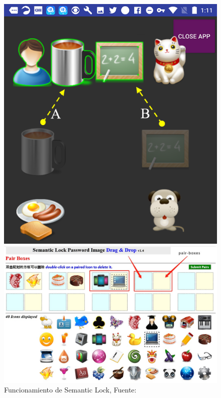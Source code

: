 \begin{anexos}
\begin{figure}[H]
\end{figure}


\begin{figure}[H]
	\centering
	\begin{minipage}{0.5\linewidth}  %
		\centering
		\includegraphics[width=0.8\linewidth]{semantoc-psw-2.png} %
		
	\end{minipage}%
	\hfill
	\begin{minipage}{0.5\linewidth} %
		\centering
		\includegraphics[width=0.8\linewidth]{semantic-psww1.jpg} %
		
	\end{minipage}
	\caption{Funcionamiento de Semantic Lock, Fuente: \cite{olade2023story}}
	\label{semantic-passw}
\end{figure}



\end{anexos}
